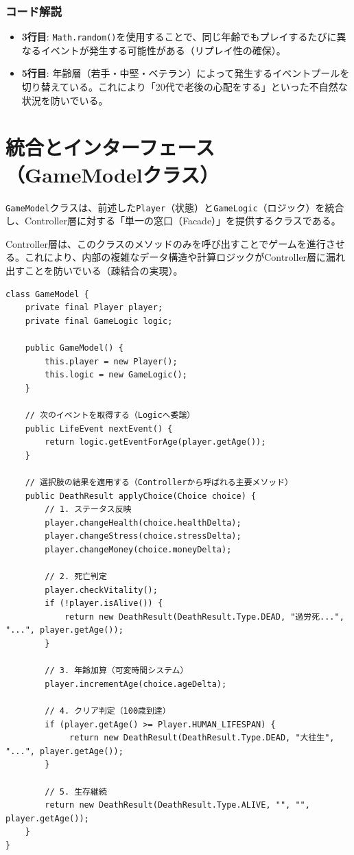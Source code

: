\documentclass[a4paper,11pt]{jsarticle}
\begin{document}
\subsubsection*{コード解説}
\begin{itemize}
    \item \textbf{3行目}: \texttt{Math.random()}を使用することで、同じ年齢でもプレイするたびに異なるイベントが発生する可能性がある（リプレイ性の確保）。
    \item \textbf{5行目}: 年齢層（若手・中堅・ベテラン）によって発生するイベントプールを切り替えている。これにより「20代で老後の心配をする」といった不自然な状況を防いでいる。
\end{itemize}



\section{統合とインターフェース（GameModelクラス）}
\texttt{GameModel}クラスは、前述した\texttt{Player}（状態）と\texttt{GameLogic}（ロジック）を統合し、Controller層に対する「単一の窓口（Facade）」を提供するクラスである。

Controller層は、このクラスのメソッドのみを呼び出すことでゲームを進行させる。これにより、内部の複雑なデータ構造や計算ロジックがController層に漏れ出すことを防いでいる（疎結合の実現）。

\begin{lstlisting}[caption=GameModel.java（主要メソッド）, label=code:gamemodel]
class GameModel {
    private final Player player;
    private final GameLogic logic;

    public GameModel() {
        this.player = new Player();
        this.logic = new GameLogic();
    }

    // 次のイベントを取得する（Logicへ委譲）
    public LifeEvent nextEvent() {
        return logic.getEventForAge(player.getAge());
    }

    // 選択肢の結果を適用する（Controllerから呼ばれる主要メソッド）
    public DeathResult applyChoice(Choice choice) {
        // 1. ステータス反映
        player.changeHealth(choice.healthDelta);
        player.changeStress(choice.stressDelta);
        player.changeMoney(choice.moneyDelta);
        
        // 2. 死亡判定
        player.checkVitality();
        if (!player.isAlive()) {
            return new DeathResult(DeathResult.Type.DEAD, "過労死...", "...", player.getAge());
        }

        // 3. 年齢加算（可変時間システム）
        player.incrementAge(choice.ageDelta);

        // 4. クリア判定（100歳到達）
        if (player.getAge() >= Player.HUMAN_LIFESPAN) {
             return new DeathResult(DeathResult.Type.DEAD, "大往生", "...", player.getAge());
        }

        // 5. 生存継続
        return new DeathResult(DeathResult.Type.ALIVE, "", "", player.getAge());
    }
}
\end{lstlisting}
\end{document}
